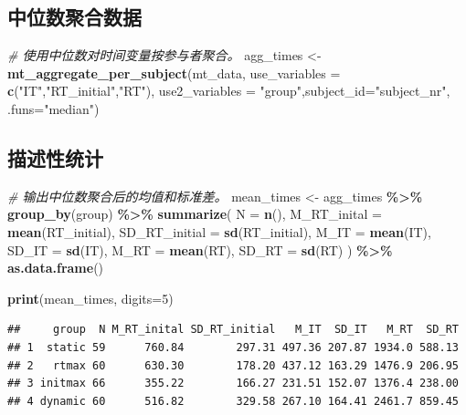 \documentclass[
]{article}
\newenvironment{Shaded}{\begin{snugshade}}{\end{snugshade}}
\newcommand{\AttributeTok}[1]{\textcolor[rgb]{0.13,0.29,0.53}{#1}}
\newcommand{\CommentTok}[1]{\textcolor[rgb]{0.56,0.35,0.01}{\textit{#1}}}
\newcommand{\DecValTok}[1]{\textcolor[rgb]{0.00,0.00,0.81}{#1}}
\newcommand{\FunctionTok}[1]{\textcolor[rgb]{0.13,0.29,0.53}{\textbf{#1}}}
\newcommand{\NormalTok}[1]{#1}
\newcommand{\OtherTok}[1]{\textcolor[rgb]{0.56,0.35,0.01}{#1}}
\newcommand{\SpecialCharTok}[1]{\textcolor[rgb]{0.81,0.36,0.00}{\textbf{#1}}}
\newcommand{\StringTok}[1]{\textcolor[rgb]{0.31,0.60,0.02}{#1}}
\begin{document}
\subsection{中位数聚合数据}\label{ux4e2dux4f4dux6570ux805aux5408ux6570ux636e}

\begin{Shaded}
\begin{Highlighting}[]
\CommentTok{\# 使用中位数对时间变量按参与者聚合。}
\NormalTok{agg\_times }\OtherTok{\textless{}{-}} \FunctionTok{mt\_aggregate\_per\_subject}\NormalTok{(mt\_data,}
  \AttributeTok{use\_variables =} \FunctionTok{c}\NormalTok{(}\StringTok{"IT"}\NormalTok{,}\StringTok{"RT\_initial"}\NormalTok{,}\StringTok{"RT"}\NormalTok{),}
  \AttributeTok{use2\_variables =} \StringTok{"group"}\NormalTok{,}\AttributeTok{subject\_id=}\StringTok{"subject\_nr"}\NormalTok{,}
  \AttributeTok{.funs=}\StringTok{"median"}\NormalTok{)}
\end{Highlighting}
\end{Shaded}

\subsection{描述性统计}\label{ux63cfux8ff0ux6027ux7edfux8ba1-1}

\begin{Shaded}
\begin{Highlighting}[]
\CommentTok{\# 输出中位数聚合后的均值和标准差。}
\NormalTok{mean\_times }\OtherTok{\textless{}{-}}\NormalTok{ agg\_times }\SpecialCharTok{\%\textgreater{}\%}
  \FunctionTok{group\_by}\NormalTok{(group) }\SpecialCharTok{\%\textgreater{}\%}
  \FunctionTok{summarize}\NormalTok{(}
    \AttributeTok{N =} \FunctionTok{n}\NormalTok{(),}
    \AttributeTok{M\_RT\_inital =} \FunctionTok{mean}\NormalTok{(RT\_initial),}
    \AttributeTok{SD\_RT\_initial =} \FunctionTok{sd}\NormalTok{(RT\_initial),}
    \AttributeTok{M\_IT =} \FunctionTok{mean}\NormalTok{(IT),}
    \AttributeTok{SD\_IT =} \FunctionTok{sd}\NormalTok{(IT),}
    \AttributeTok{M\_RT =} \FunctionTok{mean}\NormalTok{(RT),}
    \AttributeTok{SD\_RT =} \FunctionTok{sd}\NormalTok{(RT)}
\NormalTok{    ) }\SpecialCharTok{\%\textgreater{}\%}
  \FunctionTok{as.data.frame}\NormalTok{()}

\FunctionTok{print}\NormalTok{(mean\_times, }\AttributeTok{digits=}\DecValTok{5}\NormalTok{)}
\end{Highlighting}
\end{Shaded}

\begin{verbatim}
##     group  N M_RT_inital SD_RT_initial   M_IT  SD_IT   M_RT  SD_RT
## 1  static 59      760.84        297.31 497.36 207.87 1934.0 588.13
## 2   rtmax 60      630.30        178.20 437.12 163.29 1476.9 206.95
## 3 initmax 66      355.22        166.27 231.51 152.07 1376.4 238.00
## 4 dynamic 60      516.82        329.58 267.10 164.41 2461.7 859.45
\end{verbatim}
\end{document}
